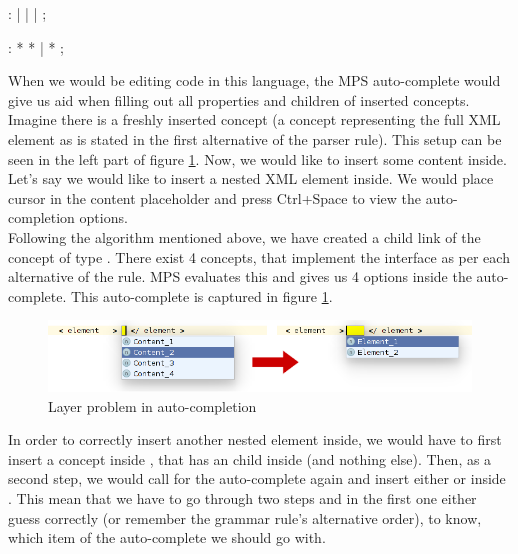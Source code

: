 \begin{antlr}
	    :   
           |   
           |   
           |   
           ;

	    :   \literal{<}  * \literal{>} * \literal{</}  \literal{>}
           |   \literal{<}  * \literal{/>}
           ;
\end{antlr}

When we would be editing code in this language, the MPS auto-complete would give us aid when filling out all properties and children of inserted concepts.
Imagine there is a freshly inserted  concept (a concept representing the full XML element as is stated in the first alternative of the  parser rule).
This setup can be seen in the left part of figure \ref{fig:layer_problem}.
Now, we would like to insert some content inside.
Let's say we would like to insert a nested XML element inside.
We would place cursor in the content placeholder and press Ctrl+Space to view the auto-completion options.
\\

Following the algorithm mentioned above, we have created a child link of the  concept of type .
There exist 4 concepts, that implement the  interface as per each alternative of the rule.
MPS evaluates this and gives us 4 options inside the auto-complete.
This auto-complete is captured in figure \ref{fig:layer_problem}.

\begin{figure}[h]
	\centering
	\includegraphics[width=\textwidth]{./img/layer_problem.png}
	\caption{Layer problem in auto-completion}
	\label{fig:layer_problem}
\end{figure}

In order to correctly insert another nested element inside, we would have to first insert a  concept inside , that has an  child inside (and nothing else).
Then, as a second step, we would call for the auto-complete again and insert either  or  inside .
This mean that we have to go through two steps and in the first one either guess correctly (or remember the grammar rule's alternative order), to know, which item of the auto-complete we should go with.
\\

